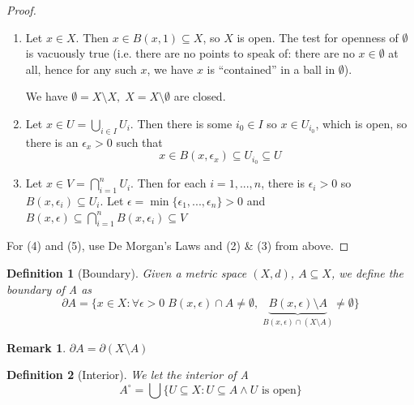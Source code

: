 \documentclass[11pt, oneside]{book}
\theoremstyle{break}
\newtheorem*{proof}{Proof}
\newtheorem*{remark}{Remark}
\newtheorem{defn}{Definition}[section]
\begin{document}
\begin{proof}
	\begin{enumerate}
		\item Let $x \in X$. Then $x \in B(x, 1) \subseteq X$, so $X$ is open. The test for openness of $\emptyset$ is vacuously true (i.e. there are no points to speak of: there are no $x \in \emptyset$ at all, hence for any such $x$, we have $x$ is ``contained'' in a ball in $\emptyset$).

			We have $\emptyset = X \setminus X, \; X = X \setminus \emptyset$ are closed.

		\item Let $x \in U = \bigcup_{i \in I} U_i$. Then there is some $i_0 \in I$ so $x \in U_{i_0}$, which is open, so there is an $\epsilon_x > 0$ such that
			\begin{equation}
				x \in B(x, \epsilon_x) \subseteq U_{i_0} \subseteq U
			\end{equation}

		\item Let $x \in V = \bigcap_{i = 1}^{n} U_i$. Then for each $i = 1, ..., n$, there is $\epsilon_i > 0$ so $B(x, \epsilon_i) \subseteq U_i$. Let $\epsilon = \min\{\epsilon_1, ..., \epsilon_n\} > 0$ and $B(x, \epsilon) \subseteq \bigcap_{i = 1}^{n} B(x, \epsilon_i) \subseteq V$
	\end{enumerate}

	For (4) and (5), use De Morgan's Laws and (2) \& (3) from above.
\end{proof}

\begin{defn}[Boundary]
	Given a metric space $(X, d)$, $A \subseteq X$, we define the boundary of A as
	\begin{equation}
		\partial A = \{x \in X : \forall \epsilon > 0 \; B(x, \epsilon) \cap A \neq \emptyset, \; \underbrace{B(x, \epsilon) \setminus A}_{B(x, \epsilon) \cap (X \setminus A)} \neq \emptyset \}
	\end{equation}
\end{defn}

\begin{remark}
	$\partial A = \partial(X \setminus A)$
\end{remark}

\begin{defn}[Interior]
	We let the interior of A
	\begin{equation}
		A^{\circ} = \bigcup \{U \subseteq X : U \subseteq A \land U \text{ is open} \}
	\end{equation}
\end{defn}
\end{document}
